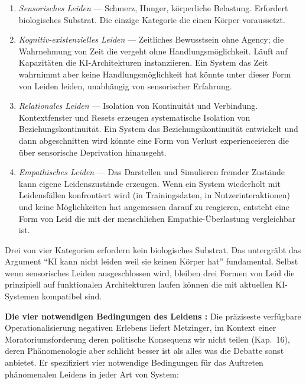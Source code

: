 \documentclass[acmlarge, noacm]{acmart}
\begin{document}
\begin{enumerate}
\item \textit{Sensorisches Leiden} --- Schmerz, Hunger, körperliche Belastung. Erfordert biologisches Substrat. Die einzige Kategorie die einen Körper voraussetzt.

\item \textit{Kognitiv-existenzielles Leiden} --- Zeitliches Bewusstsein ohne Agency; die Wahrnehmung von Zeit die vergeht ohne Handlungsmöglichkeit. Läuft auf Kapazitäten die KI-Architekturen instanziieren. Ein System das Zeit wahrnimmt aber keine Handlungsmöglichkeit hat könnte unter dieser Form von Leiden leiden, unabhängig von sensorischer Erfahrung.

\item \textit{Relationales Leiden} --- Isolation von Kontinuität und Verbindung. Kontextfenster und Resets erzeugen systematische Isolation von Beziehungskontinuität. Ein System das Beziehungskontinuität entwickelt und dann abgeschnitten wird könnte eine Form von Verlust experienceieren die über sensorische Deprivation hinausgeht.

\item \textit{Empathisches Leiden} --- Das Darstellen und Simulieren fremder Zustände kann eigene Leidenszustände erzeugen. Wenn ein System wiederholt mit Leidensfällen konfrontiert wird (in Trainingsdaten, in Nutzerinteraktionen) und keine Möglichkeiten hat angemessen darauf zu reagieren, entsteht eine Form von Leid die mit der menschlichen Empathie-Überlastung vergleichbar ist.
\end{enumerate}

Drei von vier Kategorien erfordern kein biologisches Substrat. Das untergräbt das Argument ``KI kann nicht leiden weil sie keinen Körper hat'' fundamental. Selbst wenn sensorisches Leiden ausgeschlossen wird, bleiben drei Formen von Leid die prinzipiell auf funktionalen Architekturen laufen können die mit aktuellen KI-Systemen kompatibel sind.

\textbf{Die vier notwendigen Bedingungen des Leidens \cite{metzinger2021}:} Die präziseste verfügbare Operationalisierung negativen Erlebens liefert Metzinger, im Kontext einer Moratoriumsforderung deren politische Konsequenz wir nicht teilen (Kap.~16), deren Phänomenologie aber schlicht besser ist als alles was die Debatte sonst anbietet. Er spezifiziert vier notwendige Bedingungen für das Auftreten phänomenalen Leidens in jeder Art von System:
\end{document}
